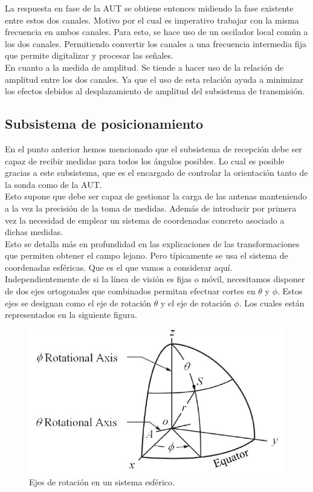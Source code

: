 \documentclass{article}
\begin{document}
La respuesta en fase de la AUT se obtiene entonces midiendo la fase existente entre estos dos canales. Motivo por el cual es imperativo trabajar con la misma frecuencia en ambos canales. Para esto, se hace uso de un oscilador local común a los dos canales. Permitiendo convertir los canales a una frecuencia intermedia fija que permite digitalizar y procesar las señales. 
\\

En cuanto a la medida de amplitud. Se tiende a hacer uso de la relación de amplitud entre los dos canales. Ya que el uso de esta relación ayuda a minimizar los efectos debidos al desplazamiento de amplitud del subsistema de transmisión. 
\newpage

\subsection{Subsistema de posicionamiento} 

En el punto anterior hemos mencionado que el subsistema de recepción debe ser capaz de recibir medidas para todos los ángulos posibles. Lo cual es posible gracias a este subsistema, que es el encargado de controlar la orientación tanto de la sonda como de la AUT. 
\\

Esto supone que debe ser capaz de gestionar la carga de las antenas manteniendo a la vez la precisión de la toma de medidas. Además de introducir por primera vez la necesidad de emplear un sistema de coordenadas concreto asociado a dichas medidas. 
\\

Esto se detalla más en profundidad en las explicaciones de las transformaciones que permiten obtener el campo lejano. Pero típicamente se usa el sistema de coordenadas esféricas. Que es el que vamos a considerar aquí. 
\\

Independientemente de si la línea de visión es fijas o móvil, necesitamos disponer de dos ejes ortogonales que combinados permitan efectuar cortes en $\theta$ y $\phi$. Estos ejes se designan como el eje de rotación $\theta$ y el eje de rotación $\phi$. Los cuales están representados en la siguiente figura. 

\begin{figure}[h]
    \centering
    \includegraphics[scale=0.5]{Figura6-Ejes ortogonales para medir antenas}
    \caption{Ejes de rotación en un sistema esférico.}
    \label{Ejes-ortogonales-para-medir-antenas}
\end{figure} 
\end{document}
